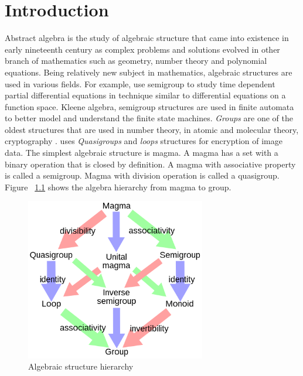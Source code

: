 \chapter{Introduction}
Abstract algebra is the study of algebraic structure that came into existence in
early nineteenth century as complex problems and solutions evolved in other
branch of mathematics such as geometry, number theory and polynomial equations.
Being relatively new subject in mathematics, algebraic structures are used in
various fields. For example, \cite{liaqat2021some} use semigroup  to study time dependent partial differential
equations in technique similar to differential equations on a function space.
Kleene algebra, semigroup structures are used in finite automata to better model
and understand the finite state machines. \textit{Groups} are one of the oldest
structures that are used in number theory, in atomic and molecular theory,
cryptography \cite{enwiki:1133598242}. \cite{didurik2018some} uses
\textit{Quasigroups} and \textit{loops} structures for encryption of image data.
The simplest algebraic structure is magma. A magma has a set with a binary
operation that is closed by definition. A magma with associative property is
called a semigroup. Magma with division operation is called a quasigroup. Figure
~\ref{fig_magma} shows the algebra hierarchy from magma to group. 
 \begin{figure}[ht]
	\centering
	\includegraphics[width=0.7\textwidth]{figures/Sample/Magma_to_group.jpg}
	\caption{Algebraic structure hierarchy \cite{enwiki:1107380309}}
	\label{fig_magma}
\end{figure}
\\

